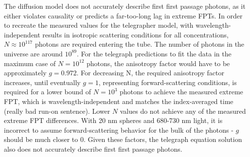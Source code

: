 \documentclass[9pt,twocolumn,twoside]{opticajnl}
\begin{document}
The diffusion model does not accurately describe first first passage photons, as it either violates causality or predicts a far-too-long lag in extreme FPTs. In order to recreate the measured values for the telegrapher model, with wavelength-independent results in isotropic scattering conditions for all concentrations, $N \approx 10^{117}$ photons are required entering the tube. The number of photons in the universe are around $10^{89}$. For the telegraph predictions to fit the data in the maximum case of $N=10^{12}$ photons, the anisotropy factor would have to be approximately $g = 0.972$. For decreasing N, the required anisotropy factor increases, until eventually $g=1$, representing forward-scattering conditions, is required for a lower bound of $N=10^{3}$ photons to achieve the measured extreme FPT, which is wavelength-independent and matches the index-averaged time (really bad run-on sentence). Lower $N$ values do not achieve any of the measured extreme FPT differences. With 20 nm spheres and 680-730 nm light, it is incorrect to assume forward-scattering behavior for the bulk of the photons - $g$ should be much closer to 0. Given these factors, the telegraph equation solution also does not accurately describe first first passage photons.

\end{document}
